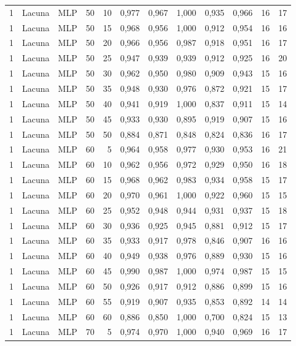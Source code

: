 \begin{longtable}{@{}rllrrrrrrrrr@{}}
1 & Lacuna & MLP & 50 & 10 & 0,977 & 0,967 & 1,000 & 0,935 & 0,966 & 16 & 17 \\
1 & Lacuna & MLP & 50 & 15 & 0,968 & 0,956 & 1,000 & 0,912 & 0,954 & 16 & 16 \\
1 & Lacuna & MLP & 50 & 20 & 0,966 & 0,956 & 0,987 & 0,918 & 0,951 & 16 & 17 \\
1 & Lacuna & MLP & 50 & 25 & 0,947 & 0,939 & 0,939 & 0,912 & 0,925 & 16 & 20 \\
1 & Lacuna & MLP & 50 & 30 & 0,962 & 0,950 & 0,980 & 0,909 & 0,943 & 15 & 16 \\
1 & Lacuna & MLP & 50 & 35 & 0,948 & 0,930 & 0,976 & 0,872 & 0,921 & 15 & 17 \\
1 & Lacuna & MLP & 50 & 40 & 0,941 & 0,919 & 1,000 & 0,837 & 0,911 & 15 & 14 \\
1 & Lacuna & MLP & 50 & 45 & 0,933 & 0,930 & 0,895 & 0,919 & 0,907 & 15 & 16 \\
1 & Lacuna & MLP & 50 & 50 & 0,884 & 0,871 & 0,848 & 0,824 & 0,836 & 16 & 17 \\
1 & Lacuna & MLP & 60 & 5 & 0,964 & 0,958 & 0,977 & 0,930 & 0,953 & 16 & 21 \\
1 & Lacuna & MLP & 60 & 10 & 0,962 & 0,956 & 0,972 & 0,929 & 0,950 & 16 & 18 \\
1 & Lacuna & MLP & 60 & 15 & 0,968 & 0,962 & 0,983 & 0,934 & 0,958 & 15 & 17 \\
1 & Lacuna & MLP & 60 & 20 & 0,970 & 0,961 & 1,000 & 0,922 & 0,960 & 15 & 15 \\
1 & Lacuna & MLP & 60 & 25 & 0,952 & 0,948 & 0,944 & 0,931 & 0,937 & 15 & 18 \\
1 & Lacuna & MLP & 60 & 30 & 0,936 & 0,925 & 0,945 & 0,881 & 0,912 & 15 & 17 \\
1 & Lacuna & MLP & 60 & 35 & 0,933 & 0,917 & 0,978 & 0,846 & 0,907 & 16 & 16 \\
1 & Lacuna & MLP & 60 & 40 & 0,949 & 0,938 & 0,976 & 0,889 & 0,930 & 15 & 16 \\
1 & Lacuna & MLP & 60 & 45 & 0,990 & 0,987 & 1,000 & 0,974 & 0,987 & 15 & 15 \\
1 & Lacuna & MLP & 60 & 50 & 0,926 & 0,917 & 0,912 & 0,886 & 0,899 & 15 & 16 \\
1 & Lacuna & MLP & 60 & 55 & 0,919 & 0,907 & 0,935 & 0,853 & 0,892 & 14 & 14 \\
1 & Lacuna & MLP & 60 & 60 & 0,886 & 0,850 & 1,000 & 0,700 & 0,824 & 15 & 13 \\
1 & Lacuna & MLP & 70 & 5 & 0,974 & 0,970 & 1,000 & 0,940 & 0,969 & 16 & 17 \\

\end{longtable}
